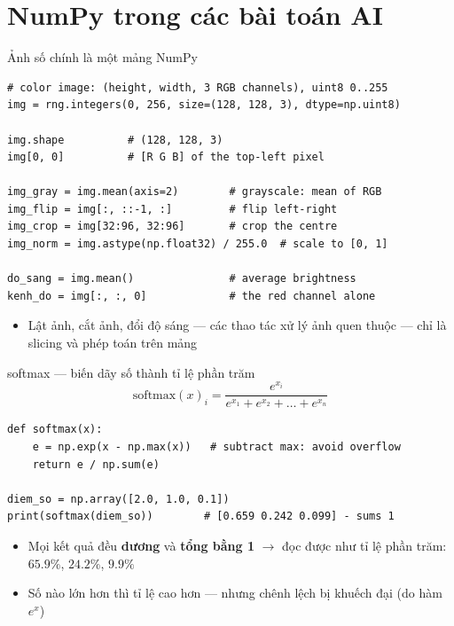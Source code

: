 \documentclass[11pt]{beamer}
\begin{document}
\section{NumPy trong các bài toán AI}

\begin{frame}[fragile]{Ảnh số chính là một mảng NumPy}
\begin{lstlisting}
# color image: (height, width, 3 RGB channels), uint8 0..255
img = rng.integers(0, 256, size=(128, 128, 3), dtype=np.uint8)

img.shape          # (128, 128, 3)
img[0, 0]          # [R G B] of the top-left pixel

img_gray = img.mean(axis=2)        # grayscale: mean of RGB
img_flip = img[:, ::-1, :]         # flip left-right
img_crop = img[32:96, 32:96]       # crop the centre
img_norm = img.astype(np.float32) / 255.0  # scale to [0, 1]

do_sang = img.mean()               # average brightness
kenh_do = img[:, :, 0]             # the red channel alone
\end{lstlisting}
\begin{itemize}
  \item Lật ảnh, cắt ảnh, đổi độ sáng --- các thao tác xử lý ảnh quen thuộc --- chỉ là slicing và phép toán trên mảng
\end{itemize}
\end{frame}

\begin{frame}[fragile]{softmax --- biến dãy số thành tỉ lệ phần trăm}
\[
  \mathrm{softmax}(x)_i = \frac{e^{x_i}}{e^{x_1} + e^{x_2} + \dots + e^{x_n}}
\]
\begin{lstlisting}
def softmax(x):
    e = np.exp(x - np.max(x))   # subtract max: avoid overflow
    return e / np.sum(e)

diem_so = np.array([2.0, 1.0, 0.1])
print(softmax(diem_so))        # [0.659 0.242 0.099] - sums 1
\end{lstlisting}
\begin{itemize}
  \item Mọi kết quả đều \textbf{dương} và \textbf{tổng bằng 1} $\to$ đọc được như tỉ lệ phần trăm:
        $65.9\%$, $24.2\%$, $9.9\%$
  \item Số nào lớn hơn thì tỉ lệ cao hơn --- nhưng chênh lệch bị khuếch đại (do hàm $e^{x}$)
\end{itemize}
\end{frame}
\end{document}
